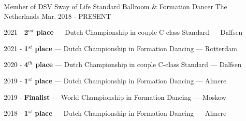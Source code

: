
\begin{cventries}




	\cventry
	{Member of DSV Sway of Life} %
	{Standard Ballroom \& Formation Dancer} %
	{The Netherlands} %
	{Mar. 2018 - PRESENT} %
	{
		\begin{cvitems} %
			\item {2021 - \textbf{2$^{nd}$ place} --- Dutch Championship in couple C-class Standard --- Dalfsen}
			\item {2021 - \textbf{1$^{st}$ place} --- Dutch Championship in Formation Dancing --- Rotterdam}
			\item {2020 - \textbf{4$^{th}$ place} --- Dutch Championship in couple C-class Standard --- Dalfsen}
			\item {2019 - \textbf{1$^{st}$ place} --- Dutch Championship in Formation Dancing --- Almere}
			\item {2019 - \textbf{Finalist} --- World Championship in Formation Dancing --- Moskow}
			\item {2018 - \textbf{1$^{st}$ place} --- Dutch Championship in Formation Dancing --- Almere}
		\end{cvitems}
	}


\end{cventries}
